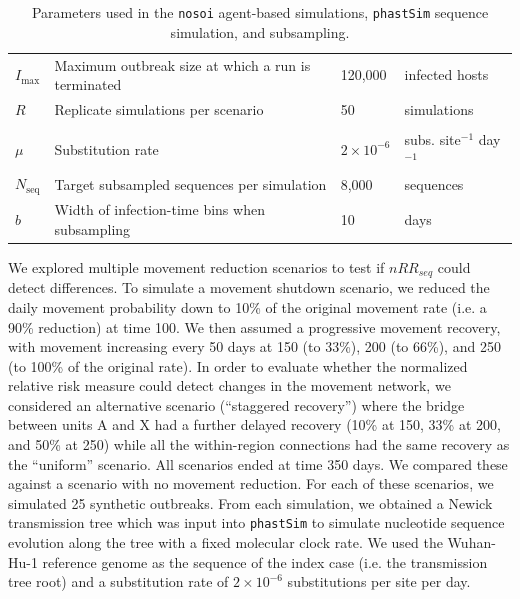 \documentclass[11pt, letterpaper, oneside]{article}
\begin{document}
\begin{table}[H]
\begin{tabular}{llll}
        $I_{\max}$   & Maximum outbreak size at which a run is terminated & 120,000 & infected hosts \\
        $R$          & Replicate simulations per scenario & 50 & simulations \\
        \addlinespace
        \multicolumn{4}{l}{\textit{Sequence simulation and subsampling}} \\
        $\mu$        & Substitution rate & $2 \times 10^{-6}$ & subs. site$^{-1}$ day$^{-1}$ \\
        $N_{\mathrm{seq}}$ & Target subsampled sequences per simulation & 8,000 & sequences \\
        $b$          & Width of infection-time bins when subsampling & 10 & days \\
        \bottomrule
    \end{tabular}
    \caption{Parameters used in the \texttt{nosoi} agent-based simulations, \texttt{phastSim} sequence simulation, and subsampling.}
    \label{tab:sim_params}
\end{table}

We explored multiple movement reduction scenarios to test if $nRR_{seq}$ could detect differences.
To simulate a movement shutdown scenario, we reduced the daily movement probability down to 10\% of the original movement rate (i.e. a 90\% reduction) at time 100.
We then assumed a progressive movement recovery, with movement increasing every 50 days at 150 (to 33\%), 200 (to 66\%), and 250 (to 100\% of the original rate).
In order to evaluate whether the normalized relative risk measure could detect changes in the movement network, we considered an alternative scenario (``staggered recovery'') where the bridge between units A and X had a further delayed recovery (10\% at 150, 33\% at 200, and 50\% at 250) while all the within-region connections had the same recovery as the ``uniform'' scenario.
All scenarios ended at time 350 days.
We compared these against a scenario with no movement reduction.
For each of these scenarios, we simulated 25 synthetic outbreaks.
From each simulation, we obtained a Newick transmission tree which was input into \texttt{phastSim} to simulate nucleotide sequence evolution along the tree with a fixed molecular clock rate.\autocite{demaioPhastSimEfficientSimulation2022}
We used the Wuhan-Hu-1 reference genome as the sequence of the index case (i.e. the transmission tree root) and a substitution rate of $2 \times 10^{-6}$ substitutions per site per day.
\end{document}
